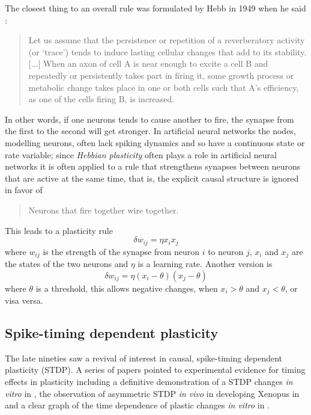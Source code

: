 \documentclass[11pt,a4paper]{scrartcl}
\begin{document}
The closest thing to an overall rule was formulated by Hebb in 1949
when he said \cite{Hebb1949a}:
\begin{quote}
Let us assume that the persistence or repetition of a reverberatory
activity (or \lq{}trace\rq{}) tends to induce lasting cellular changes that
add to its stability. [$\ldots$] When an axon of cell A is near enough to excite
a cell B and repeatedly or persistently takes part in firing it, some
growth process or metabolic change takes place in one or both cells
such that A's efficiency, as one of the cells firing B, is increased.
\end{quote}
In other words, if one neurons tends to cause another to fire, the
synapse from the first to the second will get stronger. In artificial
neural networks the nodes, modelling neurons, often lack spiking
dynamics and so have a continuous state or rate variable; since
\textsl{Hebbian plasticity} often plays a role in artificial neural
networks it is often applied to a rule that strengthens synapses
between neurons that are active at the same time, that is, the
explicit causal structure is ignored in favor of
\begin{quote}
Neurons that fire together wire together.
\end{quote}
This leads to a plasticity rule 
\begin{equation}
\delta w_{ij}=\eta x_i x_j
\end{equation}
where $w_{ij}$ is the strength of the synapse from neuron $i$ to
neuron $j$, $x_i$ and $x_j$ are the states of the two neurons and
$\eta$ is a learning rate. Another version is
\begin{equation}
\delta w_{ij}=\eta (x_i-\theta)(x_j-\theta)
\end{equation}
where $\theta$ is a threshold, this allows negative changes, when
$x_i>\theta$ and $x_j<\theta$, or visa versa.

\subsection*{Spike-timing dependent plasticity}

The late nineties saw a revival of interest in causal, spike-timing
dependent plasticity (STDP). A series of papers pointed to experimental
evidence for timing effects in plasticity
\cite{MarkramSakmann1995a,MarkramEtAl1997a,BellEtAl1997a,MageeJohnston1997a,DebanneGahwilerThompson1998a}
including a definitive demonstration of a STDP changes \textsl{in vitro} in \cite{MarkramEtAl1997a}, the
observation of asymmetric STDP \textsl{in vivo} in developing Xenopus
in \cite{ZhangTaoHoltHarrisPoo1998a} and a clear graph of the time
dependence of plastic changes \textsl{in vitro} in \cite{BiPoo1998a}.
\end{document}

